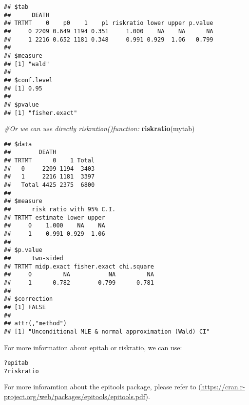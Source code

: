 \documentclass[]{book}
\newenvironment{Shaded}{\begin{snugshade}}{\end{snugshade}}
\newcommand{\KeywordTok}[1]{\textcolor[rgb]{0.13,0.29,0.53}{\textbf{#1}}}
\newcommand{\CommentTok}[1]{\textcolor[rgb]{0.56,0.35,0.01}{\textit{#1}}}
\newcommand{\NormalTok}[1]{#1}
\theoremstyle{definition}
\theoremstyle{definition}
\theoremstyle{definition}
\theoremstyle{remark}
\begin{document}
\begin{verbatim}
## $tab
##      DEATH
## TRTMT    0    p0    1    p1 riskratio lower upper p.value
##     0 2209 0.649 1194 0.351     1.000    NA    NA      NA
##     1 2216 0.652 1181 0.348     0.991 0.929  1.06   0.799
## 
## $measure
## [1] "wald"
## 
## $conf.level
## [1] 0.95
## 
## $pvalue
## [1] "fisher.exact"
\end{verbatim}

\begin{Shaded}
\begin{Highlighting}[]
\CommentTok{#Or we can use directly riskration()function:}
\KeywordTok{riskratio}\NormalTok{(mytab)}
\end{Highlighting}
\end{Shaded}

\begin{verbatim}
## $data
##        DEATH
## TRTMT      0    1 Total
##   0     2209 1194  3403
##   1     2216 1181  3397
##   Total 4425 2375  6800
## 
## $measure
##      risk ratio with 95% C.I.
## TRTMT estimate lower upper
##     0    1.000    NA    NA
##     1    0.991 0.929  1.06
## 
## $p.value
##      two-sided
## TRTMT midp.exact fisher.exact chi.square
##     0         NA           NA         NA
##     1      0.782        0.799      0.781
## 
## $correction
## [1] FALSE
## 
## attr(,"method")
## [1] "Unconditional MLE & normal approximation (Wald) CI"
\end{verbatim}

For more information about epitab or riskratio, we can use:

\begin{verbatim}
?epitab
?riskratio
\end{verbatim}

For more inforamtion about the epitools package, please refer to
(\url{https://cran.r-project.org/web/packages/epitools/epitools.pdf}).


\end{document}
